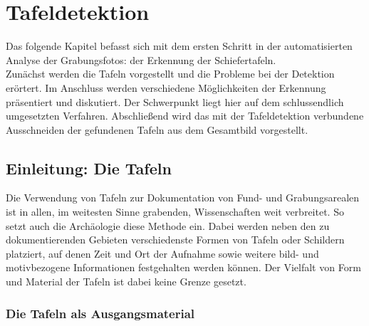 \section{Tafeldetektion}

Das folgende Kapitel befasst sich mit dem ersten Schritt in der automatisierten Analyse der Grabungsfotos: der Erkennung der Schiefertafeln.\\
Zunächst werden die Tafeln vorgestellt und die Probleme bei der Detektion erörtert. Im Anschluss werden verschiedene Möglichkeiten der Erkennung präsentiert und diskutiert. Der Schwerpunkt liegt hier auf dem schlussendlich umgesetzten Verfahren.
Abschließend wird das mit der Tafeldetektion verbundene Ausschneiden der gefundenen Tafeln aus dem Gesamtbild vorgestellt.

\subsection{Einleitung: Die Tafeln}

Die Verwendung von Tafeln zur Dokumentation von Fund- und Grabungsarealen ist in allen, im weitesten Sinne grabenden, Wissenschaften weit verbreitet. So setzt auch die Archäologie diese Methode ein. Dabei werden neben den zu dokumentierenden Gebieten verschiedenste Formen von Tafeln oder Schildern platziert, auf denen Zeit und Ort der Aufnahme sowie weitere bild- und motivbezogene Informationen festgehalten werden können. Der Vielfalt von Form und Material der Tafeln ist dabei keine Grenze gesetzt.

\subsubsection{Die Tafeln als Ausgangsmaterial}


